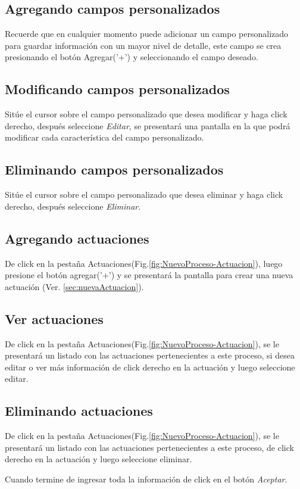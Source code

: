 \subsection{Agregando campos personalizados}
\label{sec:agregarCamposProceso}
Recuerde que en cualquier momento puede adicionar un campo personalizado para guardar informaci\'on con un mayor nivel de detalle, este campo se crea presionando el bot\'on Agregar('+') y seleccionando el campo deseado.

\subsection{Modificando campos personalizados}
\label{sec:modificarCamposProceso}
Sit\'ue el cursor sobre el campo personalizado que desea modificar y haga click derecho, despu\'es seleccione \emph{Editar},
se presentar\'a una pantalla en la que podr\'a modificar cada caracter\'istica
del campo personalizado.

\subsection{Eliminando campos personalizados}
\label{sec:eliminarCamposProceso}
Sit\'ue el cursor sobre el campo personalizado que desea eliminar y haga click derecho, despu\'es seleccione \emph{Eliminar}.

\subsection{Agregando actuaciones}
\label{sec:agregarActuacionesProceso}
De click en la pesta\~na Actuaciones(Fig.\ref{fig:NuevoProceso-Actuacion}), luego presione el bot\'on agregar('+') y se presentar\'a la pantalla para crear una nueva actuaci\'on (Ver.
\ref{sec:nuevaActuacion}).
  


\subsection{Ver actuaciones}
\label{sec:verActuacionesProceso}
De click en la pesta\~na Actuaciones(Fig.\ref{fig:NuevoProceso-Actuacion}), se le
presentar\'a un listado con las actuaciones pertenecientes a este proceso,
si desea editar o ver m\'as informaci\'on de click derecho en la actuaci\'on y luego seleccione editar.

\subsection{Eliminando actuaciones}
\label{sec:eliminarActuacionesProceso}
De click en la pesta\~na Actuaciones(Fig.\ref{fig:NuevoProceso-Actuacion}), se le
presentar\'a un listado con las actuaciones pertenecientes a este proceso,
de click derecho en la actuaci\'on y luego seleccione eliminar.

Cuando termine de ingresar toda la informaci\'on de click en el bot\'on \emph{Aceptar}.

